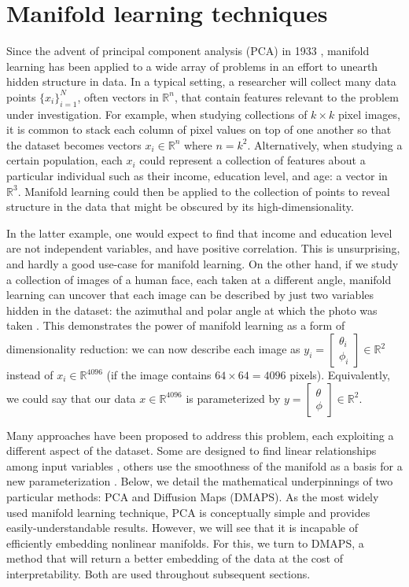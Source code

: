 \section{Manifold learning techniques \label{sec:ml}}

Since the advent of principal component analysis (PCA) in 1933
\cite{hotelling_analysis_1933}, manifold learning has been applied to a wide array of
problems in an effort to unearth hidden structure in data. In a
typical setting, a researcher will collect many data points
$\{x_i\}_{i=1}^N$, often vectors in $\mathbb{R}^n$, that contain
features relevant to the problem under investigation. For example,
when studying collections of $k \times k$ pixel images, it is common
to stack each column of pixel values on top of one another so that the
dataset becomes vectors $x_i \in \mathbb{R}^n$ where $n =
k^2$. Alternatively, when studying a certain population, each $x_i$
could represent a collection of features about a particular individual
such as their income, education level, and age: a vector in
$\mathbb{R}^3$. Manifold learning could then be applied
to the collection of points to reveal structure in the data that
might be obscured by its high-dimensionality.

In the latter example, one would expect to find that income and
education level are not independent variables, and have positive
correlation. This is unsurprising, and hardly a good use-case for
manifold learning. On the other hand, if we study a collection of
images of a human face, each taken at a different angle, manifold
learning can uncover that each image can be described by just two
variables hidden in the dataset: the azimuthal and polar angle at
which the photo was taken \cite{coifman_diffusion_2006}. This
demonstrates the power of manifold learning as a form of
dimensionality reduction: we can now describe each image as $y_i =
\begin{bmatrix} \theta_i \\ \phi_i \end{bmatrix} \in \mathbb{R}^2$
instead of $x_i \in \mathbb{R}^{4096}$ (if the image contains
$64 \times 64 = 4096$ pixels).  Equivalently, we could say that our
data $x \in \mathbb{R}^{4096}$ is parameterized by
$y = \begin{bmatrix} \theta \\ \phi \end{bmatrix} \in \mathbb{R}^2$.

Many approaches have been proposed to address this problem, each
exploiting a different aspect of the dataset. Some are designed to
find linear relationships among input variables
\cite{jolliffe_principal_2014}, others use the smoothness of the
manifold as a basis for a new parameterization
\cite{donoho_hessian_2003}. Below, we detail the mathematical
underpinnings of two particular methods: PCA and Diffusion Maps
(DMAPS). As the most widely used manifold learning technique, PCA is
conceptually simple and provides easily-understandable
results. However, we will see that it is incapable of efficiently
embedding nonlinear manifolds. For this, we turn to DMAPS, a method
that will return a better embedding of the data at the cost of
interpretability. Both are used throughout subsequent sections.

